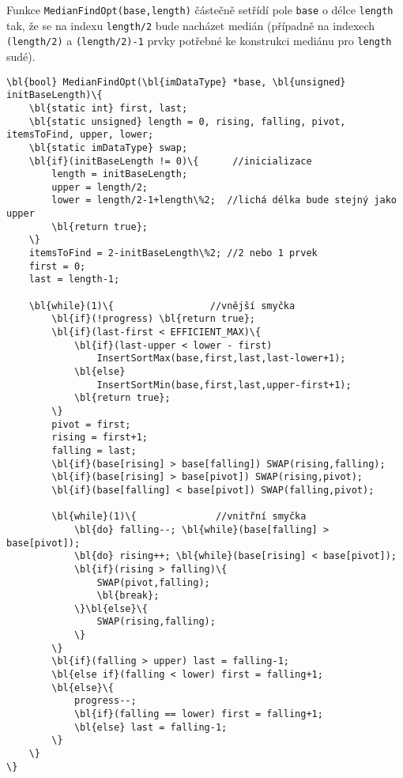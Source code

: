         Funkce {\tt MedianFindOpt(base,length)} částečně setřídí pole {\tt base} o délce {\tt length} tak, že se na indexu {\tt length/2} bude nacházet medián (případně na indexech {\tt (length/2)} a {\tt (length/2)-1} prvky potřebné ke konstrukci mediánu pro {\tt length} sudé).

        \begin{Verbatim}[commandchars = \\\{\}]
\bl{bool} MedianFindOpt(\bl{imDataType} *base, \bl{unsigned} initBaseLength)\{
    \bl{static int} first, last;
    \bl{static unsigned} length = 0, rising, falling, pivot, itemsToFind, upper, lower;
    \bl{static imDataType} swap;
    \bl{if}(initBaseLength != 0)\{      //inicializace
        length = initBaseLength;
        upper = length/2;
        lower = length/2-1+length\%2;  //lichá délka bude stejný jako upper
        \bl{return true};
    \}
    itemsToFind = 2-initBaseLength\%2; //2 nebo 1 prvek
    first = 0;	
    last = length-1;

    \bl{while}(1)\{                 //vnější smyčka
        \bl{if}(!progress) \bl{return true};
        \bl{if}(last-first < EFFICIENT_MAX)\{
            \bl{if}(last-upper < lower - first)
                InsertSortMax(base,first,last,last-lower+1);	
            \bl{else}
                InsertSortMin(base,first,last,upper-first+1);	
            \bl{return true};
        \}
        pivot = first;
        rising = first+1;
        falling = last;
        \bl{if}(base[rising] > base[falling]) SWAP(rising,falling);
        \bl{if}(base[rising] > base[pivot]) SWAP(rising,pivot);
        \bl{if}(base[falling] < base[pivot]) SWAP(falling,pivot);

        \bl{while}(1)\{			     //vnitřní smyčka				
            \bl{do} falling--; \bl{while}(base[falling] > base[pivot]);
            \bl{do} rising++; \bl{while}(base[rising] < base[pivot]);
            \bl{if}(rising > falling)\{	
                SWAP(pivot,falling);
                \bl{break};
            \}\bl{else}\{					
                SWAP(rising,falling);
            \}
        \}
        \bl{if}(falling > upper) last = falling-1;	
        \bl{else if}(falling < lower) first = falling+1;
        \bl{else}\{
            progress--;
            \bl{if}(falling == lower) first = falling+1;
            \bl{else} last = falling-1;
        \}
    \}
\}
        \end{Verbatim}

